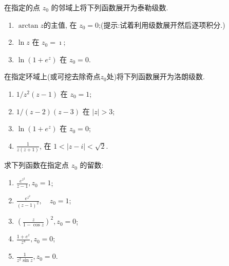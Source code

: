\documentclass[10pt]{article}
\newenvironment{problem}[2][]{\begin{trivlist}
\item[\hskip \labelsep {\bfseries #1}\hskip \labelsep {\bfseries #2}]}{\end{trivlist}}
\begin{document}
\renewcommand{\labelenumi}{(\arabic{enumi})}
\renewcommand{\labelenumii}{(\arabic{enumi}.\arabic{enumii})}



 


\begin{problem}{4.1}
  在指定的点 $z_0$ 的邻域上将下列函数展开为泰勒级数.
  \begin{enumerate}
    \item $\arctan z$的主值, 在 $z_0=0$;(提示:试着利用级数展开然后逐项积分.)
    \item $\ln z$ 在 $z_0=\imath$;
    \item $\ln \left(1+e^z\right)$ 在 $z_0=0$.
  \end{enumerate}
\end{problem}

\begin{problem}{4.2}
  在指定环域上(或可挖去除奇点$z_0$处)将下列函数展开为洛朗级数.
  \begin{enumerate}
    \item$1 / z^2(z-1)$ 在 $z_0=1$;
    \item $1 /(z-2)(z-3)$ 在 $|z|>3$;
    \item $\ln \left(1+e^z\right)$ 在 $z_0=0$;
    \item $\frac{1}{z(z+1)}$, 在 $1<|z-i|<\sqrt{2}$.
  \end{enumerate}
\end{problem}

\begin{problem}{4.3}
 求下列函数在指定点 $z_0$ 的留数:

 \begin{enumerate}
  \item  $\frac{e^{z^2}}{z-1}, z_0=1$;
  \item $\frac{e^{z^2}}{(z-1)^2}, \quad z_0=1$;
  \item $\left(\frac{z}{1-\cos z}\right)^2, z_0=0$;
  \item  $\frac{1+e^z}{z^4}, z_0=0$;
  \item $\frac{1}{z^2 \sin z}, z_0=0$.
 \end{enumerate}

\end{problem}
\end{document}
